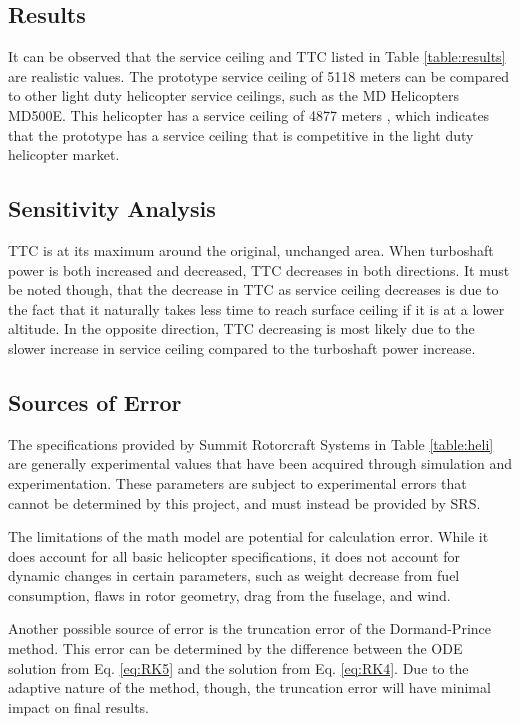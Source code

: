 \documentclass[12pt]{report}
\begin{document}
\subsection{Results}

It can be observed that the service ceiling and TTC listed in Table \ref{table:results} are realistic
values. The prototype service ceiling of 5118 meters can be compared to other light duty helicopter service ceilings, such as the
MD Helicopters MD500E. This helicopter has a service ceiling of 4877 meters \cite{md500}, which indicates that the prototype
has a service ceiling that is competitive in the light duty helicopter market.

\subsection{Sensitivity Analysis}

TTC is at its maximum around the original, unchanged area. When turboshaft power is both increased and decreased, TTC decreases
in both directions. It must be noted though, that the decrease in TTC as service ceiling decreases is due to the fact that it
naturally takes less time to reach surface ceiling if it is at a lower altitude. In the opposite direction, TTC decreasing is
most likely due to the slower increase in service ceiling compared to the turboshaft power increase.

\subsection{Sources of Error}

The specifications provided by Summit Rotorcraft Systems in Table \ref{table:heli} are generally experimental values that have
been acquired through simulation and experimentation. These parameters are subject to experimental errors that cannot be
determined by this project, and must instead be provided by SRS.

The limitations of the math model are potential for calculation error. While it does account for all basic helicopter specifications,
it does not account for dynamic changes in certain parameters, such as weight decrease from fuel consumption, flaws in rotor
geometry, drag from the fuselage, and wind.

Another possible source of error is the truncation error of the Dormand-Prince method. This error can be determined by the difference between the
ODE solution from Eq. \ref{eq:RK5} and the solution from Eq. \ref{eq:RK4}. Due to the adaptive nature of the method, though,
the truncation error will have minimal impact on final results.
\end{document}
